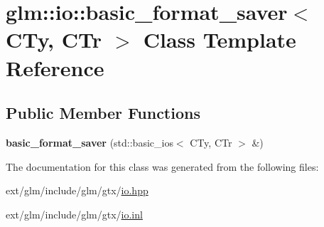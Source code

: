 \hypertarget{classglm_1_1io_1_1basic__format__saver}{\section{glm\-:\-:io\-:\-:basic\-\_\-format\-\_\-saver$<$ C\-Ty, C\-Tr $>$ Class Template Reference}
\label{classglm_1_1io_1_1basic__format__saver}
}
\subsection*{Public Member Functions}
\begin{DoxyCompactItemize}
\item 
\hypertarget{classglm_1_1io_1_1basic__format__saver_a9688fa6dce0c32285527df2336ca9127}{{\bfseries basic\-\_\-format\-\_\-saver} (std\-::basic\-\_\-ios$<$ C\-Ty, C\-Tr $>$ \&)}\label{classglm_1_1io_1_1basic__format__saver_a9688fa6dce0c32285527df2336ca9127}

\end{DoxyCompactItemize}


The documentation for this class was generated from the following files\-:\begin{DoxyCompactItemize}
\item 
ext/glm/include/glm/gtx/\hyperlink{io_8hpp}{io.\-hpp}\item 
ext/glm/include/glm/gtx/\hyperlink{io_8inl}{io.\-inl}\end{DoxyCompactItemize}
